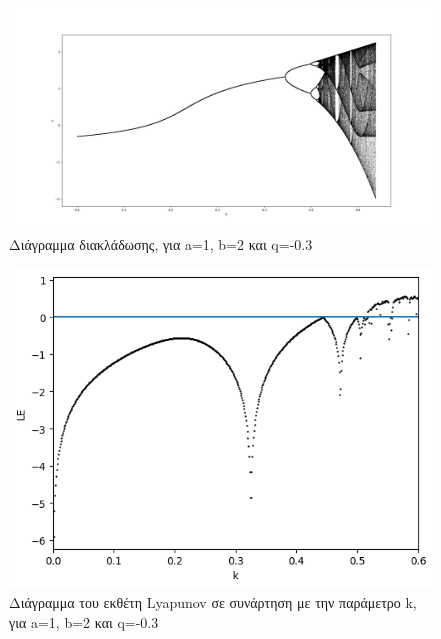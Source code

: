\begin{figure}[h!]
	\centering
	\includegraphics[width=0.8\linewidth]{LateX images/graphs q03/g1}
	\caption{ Διάγραμμα διακλάδωσης, για a=1, b=2 και q=-0.3}
	\label{f:g8}
\end{figure}

\begin{figure}[h!]
	\centering
	\includegraphics[width=0.6\linewidth]{LateX images/graphs q03/g2}
	\caption{ Διάγραμμα του εκθέτη Lyapunov σε συνάρτηση με την παράμετρο k, για a=1, b=2 και q=-0.3}
	\label{f:g9}
\end{figure}

